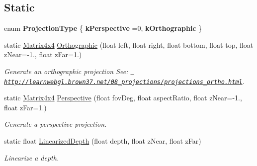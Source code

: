 \subsection*{Static}
\begin{DoxyCompactItemize}
\item 
\mbox{\label{classrev_1_1_render_projection_ad3dbfdb62fb4d64bfec7f78c545574c5}} 
enum {\bfseries Projection\+Type} \{ {\bfseries k\+Perspective} =0, 
{\bfseries k\+Orthographic}
 \}
\item 
static \mbox{\hyperlink{classrev_1_1_square_matrix}{Matrix4x4}} \mbox{\hyperlink{classrev_1_1_render_projection_a5a56c0550c8869aa1688f6a49986d51e}{Orthographic}} (float left, float right, float bottom, float top, float z\+Near=-\/1., float z\+Far=1.)
\begin{DoxyCompactList}\small\item\em Generate an orthographic projection See\+: \href{http://learnwebgl.brown37.net/08_projections/projections_ortho.html}{\texttt{ http\+://learnwebgl.\+brown37.\+net/08\+\_\+projections/projections\+\_\+ortho.\+html}}. \end{DoxyCompactList}\item 
static \mbox{\hyperlink{classrev_1_1_square_matrix}{Matrix4x4}} \mbox{\hyperlink{classrev_1_1_render_projection_af3d0f27f0b8e8eda47d04fee0174497c}{Perspective}} (float fov\+Deg, float aspect\+Ratio, float z\+Near=-\/1., float z\+Far=1.)
\begin{DoxyCompactList}\small\item\em Generate a perspective projection. \end{DoxyCompactList}\item 
static float \mbox{\hyperlink{classrev_1_1_render_projection_acc7bba2e911429136f2f5c23d55684bc}{Linearized\+Depth}} (float depth, float z\+Near, float z\+Far)
\begin{DoxyCompactList}\small\item\em Linearize a depth. \end{DoxyCompactList}\end{DoxyCompactItemize}
